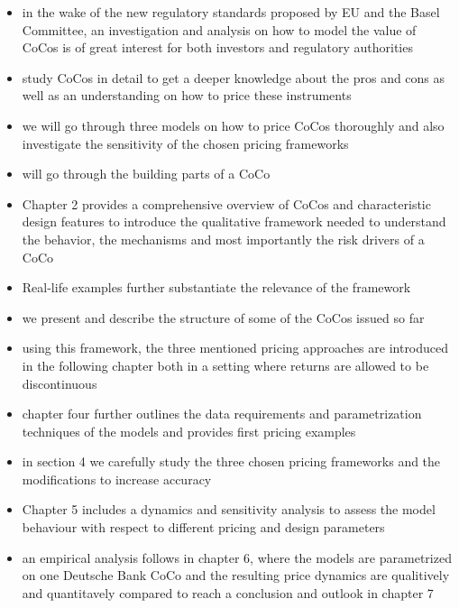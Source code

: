 \begin{itemize}
\item in the wake of the new regulatory standards proposed by EU and the Basel Committee, an investigation and analysis on how to model the value of CoCos is of great interest for both investors and regulatory authorities
\item study CoCos in detail to get a deeper knowledge about the pros and cons as well as an understanding on how to price these instruments
\item we will go through three models on how to price CoCos thoroughly and also investigate the sensitivity of the chosen pricing frameworks
\item will go through the building parts of a CoCo 
\item Chapter 2 provides a comprehensive overview of CoCos and characteristic design features to introduce the qualitative framework needed to understand the behavior, the mechanisms and most importantly the risk drivers of a CoCo
\item Real-life examples further substantiate the relevance of the framework
\item we present and describe the structure of some of the CoCos issued so far 
\item using this framework, the three mentioned pricing approaches are introduced in the following chapter both in a setting where returns are allowed to be discontinuous
\item chapter four further outlines the data requirements and parametrization techniques of the models and provides first pricing examples
\item in section 4 we carefully study the three chosen pricing frameworks and the modifications to increase accuracy
\item Chapter 5 includes a dynamics and sensitivity analysis to assess the model behaviour with respect to different pricing and design parameters
\item an empirical analysis follows in chapter 6, where the models are parametrized on one Deutsche Bank CoCo and the resulting price dynamics are qualitively and quantitavely compared to reach a conclusion and outlook in chapter 7
\end{itemize}


